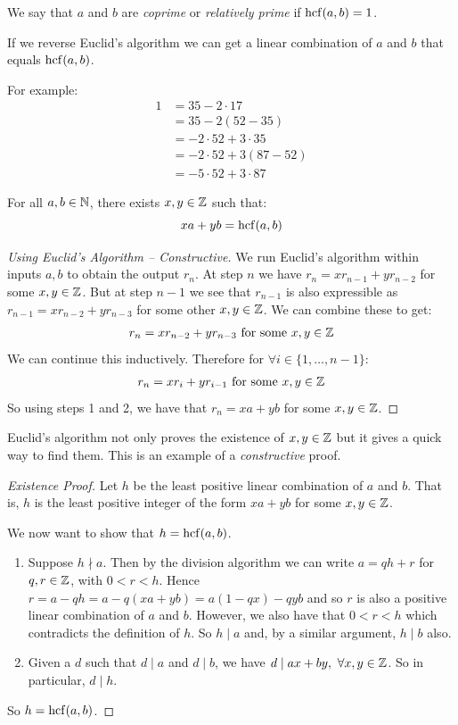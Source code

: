 \documentclass[../main.tex]{subfiles}
\begin{document}
\begin{definition}[Coprime]
  We say that $a$ and $b$ are \textit{coprime} or \textit{relatively prime} if $\operatorname{hcf}(a, b) = 1$.
\end{definition}
If we reverse Euclid's algorithm we can get a linear combination of $a$ and $b$ that equals $\operatorname{hcf}(a, b)$.
\begin{example}
  For example:
  \begin{align*}
    1 &= 35 - 2 \cdot 17 \\
      &= 35 - 2(52 - 35) \\
      &= -2 \cdot 52 + 3 \cdot 35 \\
      &= -2 \cdot 52 + 3(87 - 52) \\
      &= -5 \cdot 52 + 3 \cdot 87
  \end{align*}
\end{example}
\begin{theorem}
  For all $a, b \in \mathbb{N}$, there exists $x, y \in \mathbb{Z}$ such that:
  \[
    xa + yb = \operatorname{hcf}(a, b)
    \label{bezoutsIdentity}
  \]
\end{theorem}
\begin{proof}[Using Euclid's Algorithm -- Constructive]
  We run Euclid's algorithm within inputs $a, b$ to obtain the output $r_n$.
  At step $n$ we have $r_n = xr_{n-1} + yr_{n-2}$ for some $x, y \in \mathbb{Z}$.
  But at step $n-1$ we see that $r_{n-1}$ is also expressible as $r_{n-1} = xr_{n-2} + yr_{n-3}$ for some other $x, y \in \mathbb{Z}$.
  We can combine these to get:
  \[
    r_{n} = xr_{n-2} + yr_{n-3} \text{ for some }x, y \in \mathbb{Z}
  \]
  We can continue this inductively.
  Therefore for $\forall i \in \{1, \ldots, n - 1\}$:
  \[
    r_n = xr_i + yr_{i-1} \text{ for some }x, y \in \mathbb{Z}
  \]
  So using steps 1 and 2, we have that $r_n = xa + yb$ for some $x, y \in \mathbb{Z}$.
\end{proof}
\begin{remark}
  Euclid's algorithm not only proves the existence of $x, y \in \mathbb{Z}$ but it gives a quick way to find them.
  This is an example of a \textit{constructive} proof.
\end{remark}
\begin{proof}[Existence Proof]
  Let $h$ be the least positive linear combination of $a$ and $b$.
  That is, $h$ is the least positive integer of the form $xa + yb$ for some $x, y \in \mathbb{Z}$.

  We now want to show that $h = \operatorname{hcf}(a, b)$.
  \begin{enumerate}
    \item Suppose $h \nmid a$. Then by the division algorithm we can write $a = qh + r$ for $q, r \in \mathbb{Z}$, with $0 < r < h$.
      Hence $r = a - qh = a - q(xa + yb) = a(1-qx) - qyb$ and so $r$ is also a positive linear combination of $a$ and $b$.
      However, we also have that $0 < r < h$ which contradicts the definition of $h$.
      So $h \mid a$ and, by a similar argument, $h \mid b$ also.
    \item Given a $d$ such that $d \mid a$ and $d \mid b$, we have $d \mid ax + by,\ \forall x, y \in \mathbb{Z}$.
      So in particular, $d \mid h$.
  \end{enumerate}
  So $h = \operatorname{hcf}(a, b)$.
\end{proof}
\end{document}
